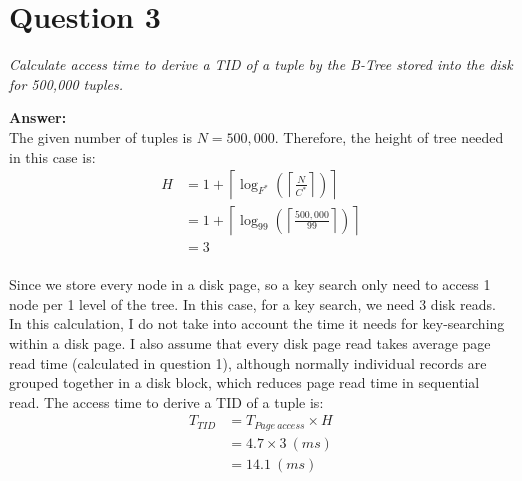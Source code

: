 \documentclass[a4paper,12pt]{article}
\begin{document}
\section*{Question 3}
\textit{Calculate access time to derive a TID of a tuple by the B-Tree stored into the disk for 500,000 tuples.} 

\noindent
\textbf{Answer:} \\ 
The given number of tuples is $N=500,000$. Therefore, the height of tree needed in this case is:
\begin{equation*}
    \begin{aligned}
        H &= 1 + \left \lceil {\log_{F^{*}}\left( \left \lceil {\frac{N}{C^{*}}} \right \rceil \right) } \right \rceil \\
        & = 1 + \left \lceil {\log_{99}\left( \left \lceil {\frac{500,000}{99}} \right \rceil \right) } \right \rceil \\
        & = 3 \\
    \end{aligned}
\end{equation*}

Since we store every node in a disk page, so a key search only need to access 1 node per 1 level of the tree. In this case, for a key search, we need 3 disk reads. In this calculation, I do not take into account the time it needs for key-searching within a disk page. I also assume that every disk page read takes average page read time (calculated in question 1), although normally individual records are grouped together in a disk block, which reduces page read time in sequential read.
The access time to derive a TID of a tuple is:
\begin{equation*}
    \begin{aligned}
        T_{TID} &= T_{Page\ access} \times H \\
        & = 4.7 \times 3 \ (ms) \\
        & = 14.1 \ (ms)
    \end{aligned}
\end{equation*}
\end{document}
